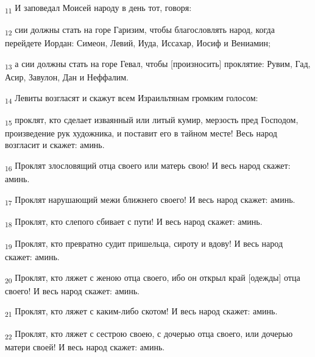 \begin{tcolorbox}
\textsubscript{11} И заповедал Моисей народу в день тот, говоря:
\end{tcolorbox}
\begin{tcolorbox}
\textsubscript{12} сии должны стать на горе Гаризим, чтобы благословлять народ, когда перейдете Иордан: Симеон, Левий, Иуда, Иссахар, Иосиф и Вениамин;
\end{tcolorbox}
\begin{tcolorbox}
\textsubscript{13} а сии должны стать на горе Гевал, чтобы [произносить] проклятие: Рувим, Гад, Асир, Завулон, Дан и Неффалим.
\end{tcolorbox}
\begin{tcolorbox}
\textsubscript{14} Левиты возгласят и скажут всем Израильтянам громким голосом:
\end{tcolorbox}
\begin{tcolorbox}
\textsubscript{15} проклят, кто сделает изваянный или литый кумир, мерзость пред Господом, произведение рук художника, и поставит его в тайном месте! Весь народ возгласит и скажет: аминь.
\end{tcolorbox}
\begin{tcolorbox}
\textsubscript{16} Проклят злословящий отца своего или матерь свою! И весь народ скажет: аминь.
\end{tcolorbox}
\begin{tcolorbox}
\textsubscript{17} Проклят нарушающий межи ближнего своего! И весь народ скажет: аминь.
\end{tcolorbox}
\begin{tcolorbox}
\textsubscript{18} Проклят, кто слепого сбивает с пути! И весь народ скажет: аминь.
\end{tcolorbox}
\begin{tcolorbox}
\textsubscript{19} Проклят, кто превратно судит пришельца, сироту и вдову! И весь народ скажет: аминь.
\end{tcolorbox}
\begin{tcolorbox}
\textsubscript{20} Проклят, кто ляжет с женою отца своего, ибо он открыл край [одежды] отца своего! И весь народ скажет: аминь.
\end{tcolorbox}
\begin{tcolorbox}
\textsubscript{21} Проклят, кто ляжет с каким-либо скотом! И весь народ скажет: аминь.
\end{tcolorbox}
\begin{tcolorbox}
\textsubscript{22} Проклят, кто ляжет с сестрою своею, с дочерью отца своего, или дочерью матери своей! И весь народ скажет: аминь.
\end{tcolorbox}
